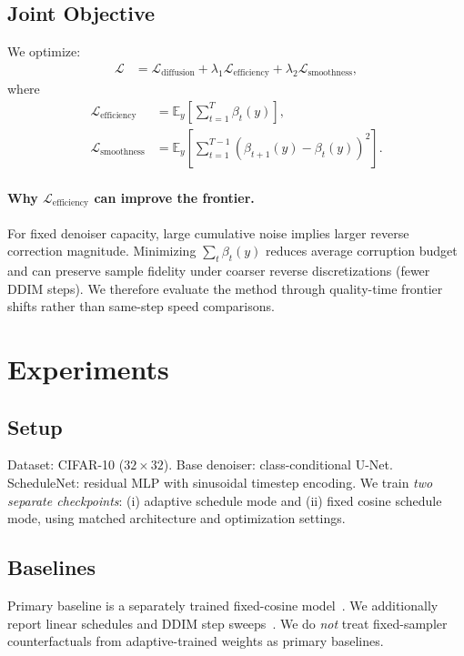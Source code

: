 \subsection{Joint Objective}
We optimize:
\begin{align}
\mathcal{L} &= \mathcal{L}_{\text{diffusion}}
 + \lambda_1 \mathcal{L}_{\text{efficiency}}
 + \lambda_2 \mathcal{L}_{\text{smoothness}},
\end{align}
where
\begin{align}
\mathcal{L}_{\text{efficiency}} &= \mathbb{E}_{y}\left[\sum_{t=1}^T \beta_t(y)\right], \\
\mathcal{L}_{\text{smoothness}} &= \mathbb{E}_{y}\left[\sum_{t=1}^{T-1}\left(\beta_{t+1}(y)-\beta_t(y)\right)^2\right].
\end{align}

\paragraph{Why $\mathcal{L}_{\text{efficiency}}$ can improve the frontier.}
For fixed denoiser capacity, large cumulative noise implies larger reverse correction magnitude. Minimizing $\sum_t \beta_t(y)$ reduces average corruption budget and can preserve sample fidelity under coarser reverse discretizations (fewer DDIM steps). We therefore evaluate the method through quality-time frontier shifts rather than same-step speed comparisons.

\section{Experiments}
\subsection{Setup}
Dataset: CIFAR-10 ($32\times32$). Base denoiser: class-conditional U-Net. ScheduleNet: residual MLP with sinusoidal timestep encoding. We train \emph{two separate checkpoints}: (i) adaptive schedule mode and (ii) fixed cosine schedule mode, using matched architecture and optimization settings.

\subsection{Baselines}
Primary baseline is a separately trained fixed-cosine model~\cite{nichol2021improved}. We additionally report linear schedules and DDIM step sweeps~\cite{song2020ddim}. We do \emph{not} treat fixed-sampler counterfactuals from adaptive-trained weights as primary baselines.


